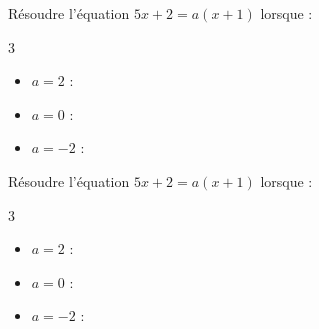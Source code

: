 \documentclass{automatisme}
\begin{document}
\newcommand{\Questions}{
	\begin{frame}
		Résoudre l'équation $5x + 2 = a(x + 1)$ lorsque :
		\begin{multicols}{3}
			\begin{itemize}
				\item[] $a = 2$ :
				\item[] $a = 0$ :
				\item[] $a = -2$ :
			\end{itemize}
		\end{multicols}
	\end{frame}
}

\Questions

\newcommand{\makeCorrection}{}
\Questions
\end{document}

